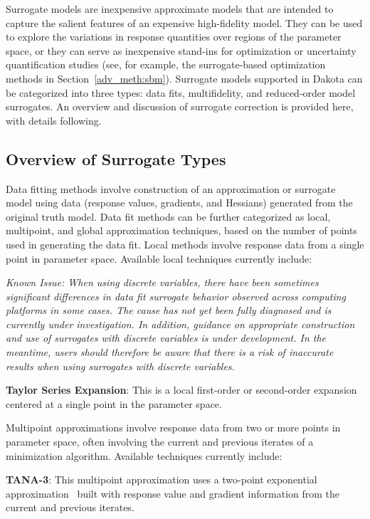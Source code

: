 Surrogate models are inexpensive approximate models that are intended
to capture the salient features of an expensive high-fidelity model.
They can be used to explore the variations in response quantities over
regions of the parameter space, or they can serve as inexpensive
stand-ins for optimization or uncertainty quantification studies (see,
for example, the surrogate-based optimization methods in
Section~\ref{adv_meth:sbm}).  Surrogate models supported in Dakota can be
categorized into three types: data fits, multifidelity, and
reduced-order model surrogates.  An overview and discussion of
surrogate correction is provided here, with details following.

\subsection{Overview of Surrogate Types}


Data fitting methods involve construction of an approximation or
surrogate model using data (response values, gradients, and Hessians)
generated from the original truth model.  Data fit methods can be
further categorized as local, multipoint, and global approximation
techniques, based on the number of points used in generating the data
fit.  Local methods involve response data from a single point in
parameter space.  Available local techniques currently include:
  
\emph{Known Issue: When using discrete variables, there have been
  sometimes significant differences in data fit surrogate behavior
  observed across computing platforms in some cases.  The cause has
  not yet been fully diagnosed and is currently under investigation.
  In addition, guidance on appropriate construction and use of
  surrogates with discrete variables is under development.  In the
  meantime, users should therefore be aware that there is a risk of
  inaccurate results when using surrogates with discrete variables.}

\textbf{Taylor Series Expansion}: This is a local first-order or
second-order expansion centered at a single point in the parameter space.

Multipoint approximations involve response data from two or more
points in parameter space, often involving the current and previous
iterates of a minimization algorithm.  Available techniques currently
include:

\textbf{TANA-3}: This multipoint approximation uses a two-point
exponential approximation~\cite{Xu98,Fad90} built with response value
and gradient information from the current and previous iterates.

